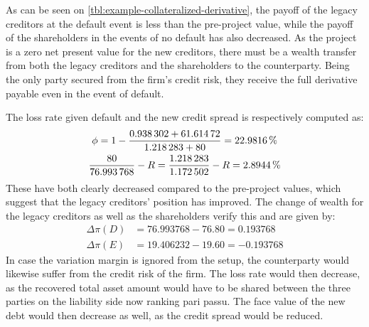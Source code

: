 \documentclass[../main.tex]{subfiles}
\begin{document}
        As can be seen on \cref{tbl:example-collateralized-derivative}, the payoff of the legacy creditors at the default event is less than the pre-project value, while the payoff of the shareholders in the events of no default has also decreased. As the project is a zero net present value for the new creditors, there must be a wealth transfer from both the legacy creditors and the shareholders to the counterparty. Being the only party secured from the firm's credit risk, they receive the full derivative payable even in the event of default.

        The loss rate given default and the new credit spread is respectively computed as:
            \begin{gather}
                \phi 
                = 
                    1 
                    - 
                    \frac{
                        \num{0.938302}+\num{61.61472}
                    }{
                        \num{1.218283}+\num{80}
                    }
                = 
                    \pct{0.229816}
                \\
                    \frac{
                        \num{80}    
                    }{
                        \num{76.993768} 
                    } 
                    - 
                    \grossrfrate 
                = 
                    \frac{
                        \num{1.218283}
                    }{        
                        \num{1.172502} 
                    } 
                    -
                    \grossrfrate 
                = 
                    \pct{0.028944} 
            \end{gather}
        These have both clearly decreased compared to the pre-project values, which suggest that the legacy creditors' position has improved.
        The change of wealth for the legacy creditors as well as the shareholders verify this and are given by:
        \begin{align}
            \Delta \pi(D) &= \num{76.993768} - \num{76.80} = \num{0.193768}\\
            \Delta \pi(E) &= \num{19.406232} - \num{19.60} = \num{-0.193768}
        \end{align}
        In case the variation margin is ignored from the setup, the counterparty would likewise suffer from the credit risk of the firm.
        The loss rate would then decrease,
        as the recovered total asset amount would have to be shared between the three parties on the liability side now ranking pari passu.
        The face value of the new debt would then decrease as well, as the credit spread would be reduced.
\end{document}
